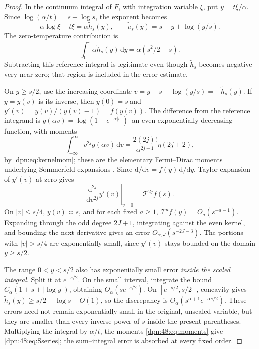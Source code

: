 \documentclass[11pt]{article}
\numberwithin{equation}{section}
\theoremstyle{definition}\newtheorem{definition}[theorem]{Definition}
\theoremstyle{remark}\newtheorem{remark}[theorem]{Remark}
\newcommand{\dd}{\,\mathrm d}\newcommand{\ii}{\mathrm i}
\newcommand{\Top}{\mathcal T}
\begin{document}
\begin{proof}
In the continuum integral of $F$, with integration variable $\xi$, put
$y=t\xi/\alpha$.  Since $\log(\alpha/t)=s-\log s$, the exponent becomes
\[
 \alpha\log\xi-t\xi=\alpha\tilde h_s(y),\qquad
 \tilde h_s(y)=s-y+\log(y/s).
\]
The zero-temperature contribution is
\begin{equation}\label{dpn:48:eq:zerotempintegral}
 \int_0^s \alpha\tilde h_s(y)\dd y=\alpha(s^2/2-s).
\end{equation}
Subtracting this reference integral is legitimate even though $\tilde h_s$
becomes negative very near zero; that region is included in the error
estimate.

On $y\ge s/2$, use the increasing coordinate $v=y-s-\log(y/s)=-\tilde h_s(y)$.
If $y=y(v)$ is its inverse, then $y(0)=s$ and $y'(v)=y(v)/(y(v)-1)=f(y(v))$.
The difference from the reference integrand is $g(\alpha v)=\log(1+e^{-\alpha|v|})$,
an even exponentially decreasing function, with moments
\begin{equation}\label{dpn:48:eq:moments}
 \int_{-\infty}^{\infty}v^{2j}g(\alpha v)\dd v
    =\frac{2(2j)!}{\alpha^{2j+1}}\eta(2j+2),
\end{equation}
by \eqref{dpn:eq:kernelmom}; these are the elementary Fermi--Dirac moments
underlying Sommerfeld expansions \cite{DLMFFermi}.  Since $\mathrm d/\mathrm dv
=f(y)\,\mathrm d/\mathrm dy$, Taylor expansion of $y'(v)$ at zero gives
\[
 \left.\frac{\mathrm d^{2j}}{\mathrm dv^{2j}}y'(v)\right|_{v=0}
       =\Top^{2j}f(s).
\]
On $|v|\le s/4$, $y(v)\asymp s$, and for each fixed $a\ge1$,
$\Top^af(y)=O_a(s^{-a-1})$.  Expanding through the odd degree $2J+1$,
integrating against the even kernel, and bounding the next derivative gives an
error $O_{\alpha,J}(s^{-2J-3})$.  The portions with $|v|>s/4$ are exponentially
small, since $y'(v)$ stays bounded on the domain $y\ge s/2$.

The range $0<y<s/2$ also has exponentially small error \emph{inside the scaled
integral}.  Split it at $e^{-s/2}$.  On the small interval, integrate the bound
$C_\alpha(1+s+|\log y|)$, obtaining $O_\alpha(se^{-s/2})$.  On
$[e^{-s/2},s/2]$, concavity gives $\tilde h_s(y)\ge s/2-\log s-O(1)$, so the
discrepancy is $O_\alpha(s^{\alpha+1}e^{-\alpha s/2})$.  These errors need not
remain exponentially small in the original, unscaled variable, but they are
smaller than every inverse power of $s$ inside the present parentheses.
Multiplying the integral by $\alpha/t$, the moments \eqref{dpn:48:eq:moments}
give \eqref{dpn:48:eq:Sseries}; the sum--integral error is absorbed at every
fixed order.


\end{proof}
\end{document}
